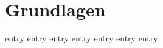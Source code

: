 \chapter{Grundlagen}
\label{chap:grundlagen}

{entry}
{entry}
{entry}
{entry}
{entry}
{entry}
{entry}

